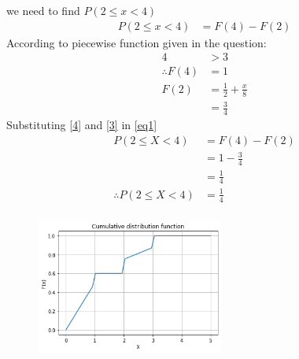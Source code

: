 \documentclass[journal,12pt,twocolumn]{IEEEtran}
\begin{document}
we need to find $ P(2 \leq x<4) $
\begin{align}
P(2 \leq x<4)&=F(4)-F(2) \label{eq1}
\end{align}
According to piecewise function given in the question:\\

\begin{align}
4&>3\\
\therefore F(4)&=1 \label{3} \\
F(2)&=\frac{1}{2}+ \frac{x}{8}\\
 &=\frac{3}{4} \label{4}
\end{align}
Substituting \eqref{4} and \eqref{3} in \eqref{eq1}
\begin{align}
P(2 \leq X <4)&=F(4)-F(2)\\
&=1-\frac{3}{4}\\
&=\frac{1}{4}\\
\therefore P(2 \leq X <4)&=\frac{1}{4}\\
\end{align}


\begin{figure}[htb!]
\begin{center}
\includegraphics[width=0.55\textwidth]{assignment2.png}
\end{center}
\end{figure}
\end{document}
